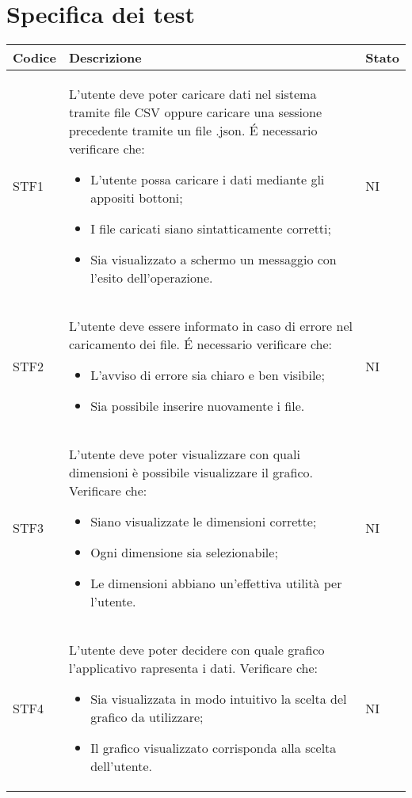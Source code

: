 \section{Specifica dei test}
    \begin{longtable}{|p{1.5cm}|p{11cm}|p{1cm}|} \hline
      \textbf{Codice} & \textbf{Descrizione} & \textbf{Stato} \\ \hline
        STF1 & L'utente deve poter caricare dati nel sistema tramite file CSV oppure caricare una sessione precedente tramite un file .json. \'E necessario verificare che: \begin{itemize}
            \item L'utente possa caricare i dati mediante gli appositi bottoni;
            \item I file caricati siano sintatticamente corretti;
            \item Sia visualizzato a schermo un messaggio con l'esito dell'operazione.
        \end{itemize} & NI\\ \hline
        
        STF2 & L'utente deve essere informato in caso di errore nel caricamento dei file. \'E necessario verificare che: \begin{itemize}
            \item L'avviso di errore sia chiaro e ben visibile;
            \item Sia possibile inserire nuovamente i file.
        \end{itemize} & NI\\ \hline

        STF3 & L'utente deve poter visualizzare con quali dimensioni è possibile visualizzare il grafico. Verificare che: \begin{itemize}
            \item Siano visualizzate le dimensioni corrette;
            \item Ogni dimensione sia selezionabile;
            \item Le dimensioni abbiano un'effettiva utilità per l'utente.
        \end{itemize} & NI\\ \hline

        STF4 & L'utente deve poter decidere con quale grafico l'applicativo rapresenta i dati. Verificare che: \begin{itemize}
            \item Sia visualizzata in modo intuitivo la scelta del grafico da utilizzare;
            \item Il grafico visualizzato corrisponda alla scelta dell'utente.
        \end{itemize} & NI\\ \hline


\end{longtable}
